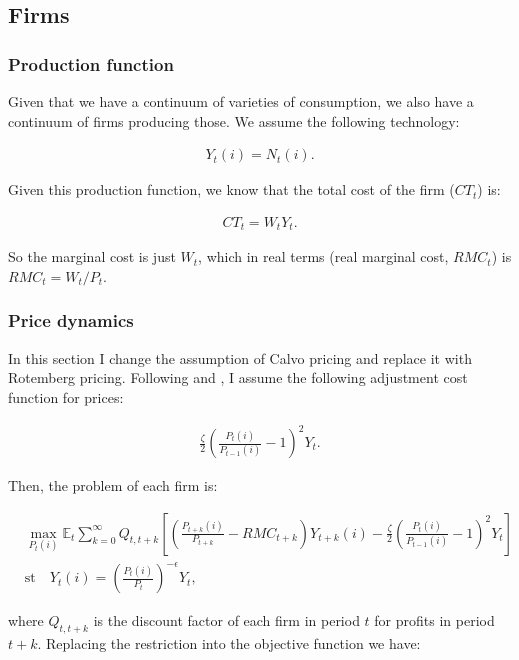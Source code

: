 \documentclass[12pt]{article}
\numberwithin{equation}{section}
\begin{document}
\subsection{Firms}

\subsubsection{Production function}

Given that we have a continuum of varieties of consumption, we also have a continuum of firms producing those. We assume the following technology:

\begin{align*}
Y_t(i)=N_t(i).
\end{align*}

Given this production function, we know that the total cost of the firm ($CT_t$) is:

\begin{align*}
CT_t=W_tY_t.
\end{align*}

So the marginal cost is just $W_t$, which in real terms (real marginal cost, $RMC_t$) is $RMC_t=W_t/P_t$.

\subsubsection{Price dynamics}

In this section I change the assumption of Calvo pricing and replace it with Rotemberg pricing. Following \cite{AscariEtAl2012} and \cite{Rotemberg1982}, I assume the following adjustment cost function for prices:

\begin{align*}
\frac{\zeta}{2}\left(\frac{P_t(i)}{P_{t-1}(i)}-1\right)^2Y_t.
\end{align*}

Then, the problem of each firm is:

\begin{align*}
&\max_{P_t(i)} \mathbb{E}_t \sum_{k=0}^{\infty}Q_{t,t+k}\left[\left(\frac{P_{t+k}(i)}{P_{t+k}} - RMC_{t+k} \right)Y_{t+k}(i) - \frac{\zeta}{2}\left(\frac{P_t(i)}{P_{t-1}(i)}-1\right)^2Y_t\right]\\
&\text{st} \quad Y_t(i)=\left(\frac{P_t(i)}{P_t}\right)^{-\epsilon}Y_t,
\end{align*}

where $Q_{t,t+k}$ is the discount factor of each firm in period $t$ for profits in period $t+k$. Replacing the restriction into the objective function we have:
\end{document}
